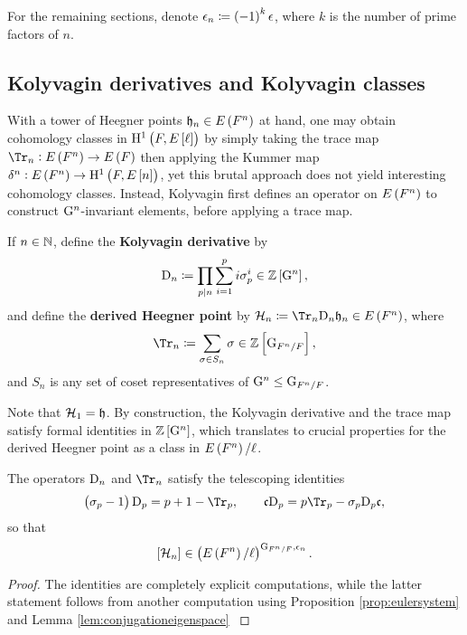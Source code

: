 For the remaining sections, denote $ \epsilon_n \coloneqq \br{-1}^k\epsilon $, where $ k $ is the number of prime factors of $ n $.

\subsection{Kolyvagin derivatives and Kolyvagin classes}

With a tower of Heegner points $ \hhh_n \in E\br{F^n} $ at hand, one may obtain cohomology classes in $ \H^1\br{F, E\sbr{\ell}} $ by simply taking the trace map $ \Tr_n : E\br{F^n} \to E\br{F} $ then applying the Kummer map $ \delta^n : E\br{F^n} \to \H^1\br{F, E\sbr{n}} $, yet this brutal approach does not yield interesting cohomology classes. Instead, Kolyvagin first defines an operator on $ E\br{F^n} $ to construct $ \mathrm{G}^n $-invariant elements, before applying a trace map.

\begin{definition}
If $ n \in \mathbb{N} $, define the \textbf{Kolyvagin derivative} by
$$ \D_n \coloneqq \prod_{p \mid n} \sum_{i = 1}^p i\sigma_p^i \in \ZZ\sbr{\G^n}, $$
and define the \textbf{derived Heegner point} by $ \HHH_n \coloneqq \Tr_n\D_n \hhh_n \in E\br{F^n} $, where
$$ \Tr_n \coloneqq \sum_{\sigma \in S_n} \sigma \in \ZZ\sbr{\G_{F^n / F}}, $$
and $ S_n $ is any set of coset representatives of $ \mathrm{G}^n \le \mathrm{G}_{F^n / F} $.
\end{definition}

\pagebreak

Note that $ \mathcal{H}_1 = \mathfrak{h} $. By construction, the Kolyvagin derivative and the trace map satisfy formal identities in $ \ZZ\sbr{\G^n} $, which translates to crucial properties for the derived Heegner point as a class in $ E\br{F^n} / \ell $.

\begin{lemma}
\label{lem:kolyvaginderivative}
The operators $ \mathrm{D}_n $ and $ \Tr_n $ satisfy the telescoping identities
$$ \br{\sigma_p - 1}\D_p = p + 1 - \Tr_p, \qquad \ccc\D_p = p\Tr_p - \sigma_p\D_p\ccc, $$
so that
$$ \sbr{\HHH_n} \in \br{E\br{F^n} / \ell}^{\G_{F^n / F}, \epsilon_n}. $$
\end{lemma}

\begin{proof}
The identities are completely explicit computations, while the latter statement follows from another computation using Proposition \ref{prop:eulersystem} and Lemma \ref{lem:conjugationeigenspace} \cite[Proposition 3.6 and Proposition 5.4]{Gro91}
\end{proof}

